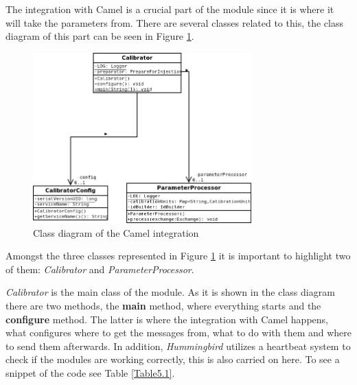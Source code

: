 The integration with Camel is a crucial part of the module since it is where it will take the parameters from. There are several classes related to this, the class diagram of this part can be seen in Figure \ref{f5.1}. 

\begin{figure}[H]
\centerline{\includegraphics[width=0.75\textwidth]{images/CalibratorCamelClassDiagram.png}}
\caption{Class diagram of the Camel integration}
\label{f5.1}
\end{figure}

Amongst the three classes represented in Figure \ref{f5.1} it is important to highlight two of them: \emph{Calibrator} and \emph{ParameterProcessor}.

\emph{Calibrator} is the main class of the module. As it is shown in the class diagram there are two methods, the \textbf{main} method, where everything starts and the \textbf{configure} method. The latter is where the integration with Camel happens, what configures where to get the messages from, what to do with them and where to send them afterwards. In addition, \emph{Hummingbird} utilizes a heartbeat system to check if the modules are working correctly, this is also carried on here. To see a snippet of the code see Table \ref{Table5.1}.

